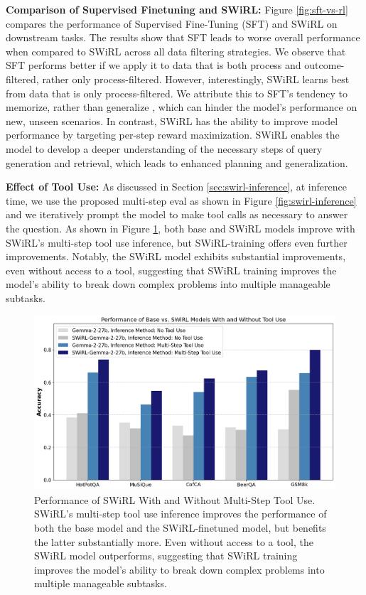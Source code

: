\documentclass{article} %
\begin{document}
\noindent\textbf{Comparison of Supervised Finetuning and SWiRL:} Figure \ref{fig:sft-vs-rl} compares the performance of Supervised Fine-Tuning (SFT) and SWiRL on downstream tasks. The results show that SFT leads to worse overall performance when compared to SWiRL across all data filtering strategies. We observe that SFT performs better if we apply it to data that is both process and outcome-filtered, rather only process-filtered. However, interestingly, SWiRL learns best from data that is only process-filtered. We attribute this to SFT's tendency to memorize, rather than generalize \citep{chu2025sftmemorizesrlgeneralizes, setlur2024rlincorrectsyntheticdata}, which can hinder the model's performance on new, unseen scenarios. In contrast, SWiRL has the ability to improve model performance by targeting per-step reward maximization. SWiRL enables the model to develop a deeper understanding of the necessary steps of query generation and retrieval, which leads to enhanced planning and generalization. 

\noindent\textbf{Effect of Tool Use:} As discussed in Section \ref{sec:swirl-inference}, at inference time, we use the proposed multi-step eval as shown in Figure \ref{fig:swirl-inference} and we iteratively prompt the model to make tool calls as necessary to answer the question. 
As shown in Figure \ref{fig:tooluse}, both base and SWiRL models improve with SWiRL's multi-step tool use inference, but SWiRL-training offers even further improvements. Notably, the SWiRL model exhibits substantial improvements, even without access to a tool, suggesting that SWiRL training improves the model's ability to break down complex problems into multiple manageable subtasks.

\begin{figure}
    \centering
    \includegraphics[width=.8\textwidth]{tooluse.png}
    \caption{Performance of SWiRL With and Without Multi-Step Tool Use. SWiRL's multi-step tool use inference improves the performance of both the base model and the SWiRL-finetuned model, but benefits the latter substantially more. Even without access to a tool, the SWiRL model outperforms, suggesting that SWiRL training improves the model's ability to break down complex problems into multiple manageable subtasks.}
    \label{fig:tooluse}
\end{figure}
\end{document}
